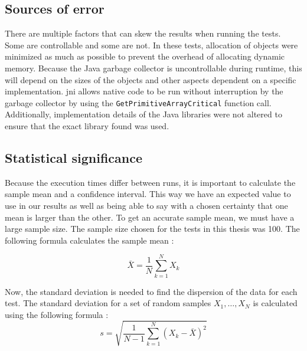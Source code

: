 \subsection{Sources of error}
There are multiple factors that can skew the results when running the tests. Some are controllable and some are not. In these tests, allocation of objects were minimized as much as possible to prevent the overhead of allocating dynamic memory. Because the Java garbage collector is uncontrollable during runtime, this will depend on the sizes of the objects and other aspects dependent on a specific implementation. \gls{jni} allows native code to be run without interruption by the garbage collector by using the \texttt{GetPrimitiveArrayCritical} function call. Additionally, implementation details of the Java libraries were not altered to ensure that the exact library found was used.


\subsection{Statistical significance}
Because the execution times differ between runs, it is important to calculate the sample mean and a confidence interval. This way we have an expected value to use in our results as well as being able to say with a chosen certainty that one mean is larger than the other. To get an accurate sample mean, we must have a large sample size. The sample size chosen for the tests in this thesis was 100. The following formula calculates the sample mean \cite[p.263]{olofsson2012probability}:

\begin{equation*}
    \bar{X} = \frac{1}{N} \sum\limits_{k = 1}^{N} X_k
\end{equation*}

Now, the standard deviation is needed to find the dispersion of the data for each test. The standard deviation for a set of random samples $X_1, \dots, X_N$ is calculated using the following formula \cite[p.~302]{olofsson2012probability}:
\begin{equation*}
    s = \sqrt{\frac{1}{N - 1} \sum\limits_{k = 1}^{N}\left(X_k - \bar{X}\right)^2}
\end{equation*}

